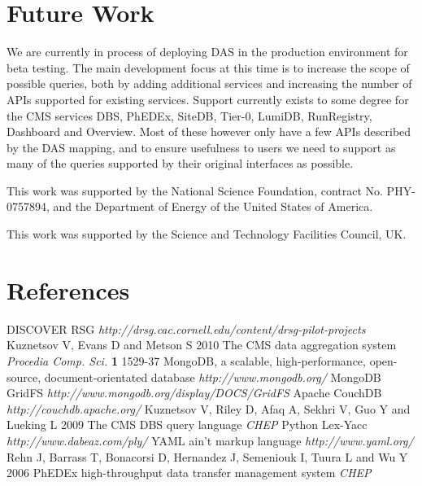 \documentclass[a4paper]{jpconf}
\begin{document}
\section{Future Work}

We are currently in process of deploying DAS in the production environment for beta testing. The main development focus at this time is to increase the scope of possible queries, both by adding additional services and increasing the number of APIs supported for existing services. Support currently exists to some degree for the CMS services DBS, PhEDEx, SiteDB, Tier-0, LumiDB, RunRegistry, Dashboard and Overview. Most of these however only have a few APIs described by the DAS mapping, and to ensure usefulness to users we need to support as many of the queries supported by their original interfaces as possible.

\ack

This work was supported by the National Science Foundation, contract No. PHY-0757894, and the Department of Energy of the United States of America.

This work was supported by the Science and Technology Facilities Council, UK.

\appendix

\section*{References}
\begin{thebibliography}{9}
 DISCOVER RSG {\it http://drsg.cac.cornell.edu/content/drsg-pilot-projects}
 Kuznetsov V, Evans D and Metson S 2010 The CMS data aggregation system {\it Procedia Comp. Sci.} {\bf 1} 1529-37
 MongoDB, a scalable, high-performance, open-source, document-orientated database {\it http://www.mongodb.org/}
 MongoDB GridFS {\it http://www.mongodb.org/display/DOCS/GridFS}
 Apache CouchDB {\it http://couchdb.apache.org/}
 Kuznetsov V, Riley D, Afaq A, Sekhri V, Guo Y and Lueking L 2009 The CMS DBS query language {\it CHEP}
 Python Lex-Yacc {\it http://www.dabeaz.com/ply/}
 YAML ain't markup language {\it http://www.yaml.org/}
 Rehn J, Barrass T, Bonacorsi D, Hernandez J, Semeniouk I, Tuura L and Wu Y 2006 PhEDEx high-throughput data transfer management system {\it CHEP}
\end{thebibliography}
\end{document}

